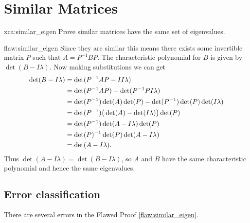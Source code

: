 \section{Similar Matrices}

\begin{xca}{xca:similar_eigen}
Prove similar matrices have the same set of eigenvalues.
\end{xca}

\begin{flaw}{flaw:similar_eigen} %
Since they are similar this means there exists some invertible matrix $P$ such that $A = P^{-1}BP$. The characteristic polynomial for $B$ is given by $\det(B - I\lambda)$. Now making substitutions we can get
\begin{align*}
    \det(B - I\lambda) &= \det(P^{-1}AP - II\lambda)\\
    &= \det(P^{-1}AP) - \det(P^{-1}PI\lambda)\\
    &= \det(P^{-1})\det(A)\det(P) - \det(P^{-1})\det(P)\det(I\lambda)\\
    &= \det(P^{-1})\big{(}\det(A) - \det(I\lambda)\big{)}\det(P)\\
    &= \det(P^{-1})\det(A - I\lambda)\det(P)\\
    &= \det(P)^{-1}\det(P)\det(A - I\lambda)\\
    &= \det(A - I\lambda).
\end{align*}
Thus $\det(A - I\lambda) = \det(B - I\lambda)$, so $A$ and $B$ have the same characteristic polynomial and hence the same eigenvalues.
\end{flaw}

\clearpage
\subsection{Error classification}


There are several errors
 in the Flawed Proof \ref{flaw:similar_eigen}.

